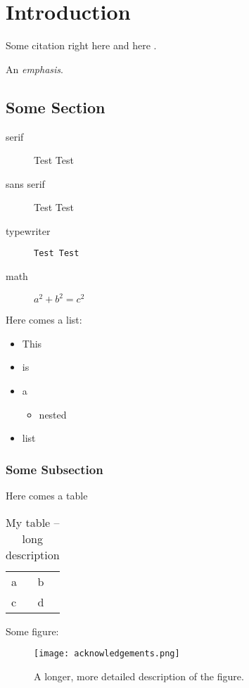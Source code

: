 \chapter{Introduction}

\blindtext

Some citation right here \cite{shannon2001} and here \cite{rfc4291,
ripeBestPractice}.

An \emph{emphasis}.

\section{Some Section}
\blindtext

\begin{description}
\item[serif] Test Test
\item[sans serif] \textsf{Test Test}
\item[typewriter] \texttt{Test Test}
\item[math] $a^2+b^2= c^2$
\end{description}

Here comes a list:
\begin{itemize}
    \item This
    \item is
    \item a
    \begin{itemize}
        \item nested
    \end{itemize}
    \item list 
\end{itemize}


\subsection{Some Subsection}
\blindtext

Here comes a table
\begin{table}[h!]
    \begin{tabular}{ l l }
    a & b \\ 
    c & d
    \end{tabular}
    \centering
    \caption[My table -- short description]{My table -- long description}
\end{table}

Some figure:
\begin{figure}[h]
  \centering
  \texttt{[image: acknowledgements.png]}
  \caption[Short caption for list of figures]{A longer, more detailed
  description of the figure.}
  \label{fig:acknowledgements}
\end{figure}

